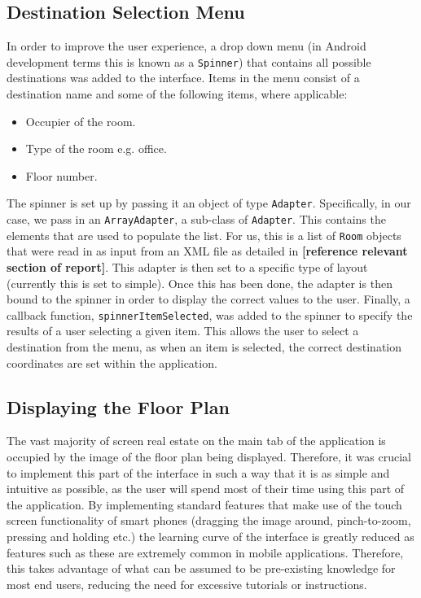 \documentclass[main.tex]{subfiles}
\begin{document}
        \subsection*{Destination Selection Menu}
            In order to improve the user experience, a drop down menu (in Android development terms this is known as a \texttt{Spinner}) that contains
            all possible destinations was added to the interface. Items in the menu consist of a destination name and some of the following items,
            where applicable:
            \begin{itemize}
                \item Occupier of the room.
                \item Type of the room e.g. office.
                \item Floor number.
            \end{itemize}
            The spinner is set up by passing it an object of type \texttt{Adapter}. Specifically, in our case, we pass in an \texttt{ArrayAdapter}, a sub-class of \texttt{Adapter}.
            This contains the elements
            that are used to populate the list. For us, this is a list of \texttt{Room} objects that were read in as input from an XML file as detailed in
            \textbf{[reference relevant section of report]}.
            This adapter is then set to a specific type of layout (currently this is set to simple). Once this has been done, the adapter is then bound to the spinner in order to display
            the correct values to the user. Finally, a callback function, \texttt{spinnerItemSelected}, was added to the spinner to specify the results of a user selecting a given item.
            This allows the user to select a destination from the menu, as when an item is selected, the correct destination coordinates are set within the application.
        \subsection*{Displaying the Floor Plan}
            The vast majority of screen real estate on the main tab of the application is occupied by the image of the floor plan being displayed. Therefore, it was crucial to 
            implement this part of the interface in such a way that it is as simple and intuitive as possible, as the user will spend most of their time using this part of
            the application. By implementing standard features that make use of the touch screen functionality of smart phones (dragging the image around, pinch-to-zoom,
            pressing and holding etc.)
            the learning curve of the interface is greatly reduced as features such as these are extremely common in mobile applications. Therefore, this takes advantage of 
            what can be assumed to be pre-existing knowledge for most end users, reducing the need for excessive tutorials or instructions.
            
\end{document}
